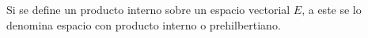 \documentclass[compacto,10pt]{pubciencias-notas}
\begin{document}
\begin{advertencia}
    Si se define un producto interno sobre un espacio vectorial $E$, a este se lo denomina espacio con producto interno o prehilbertiano.
\end{advertencia}


\end{document}
